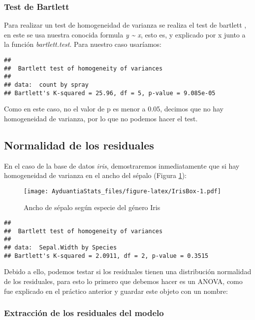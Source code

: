 \documentclass[]{book}
\begin{document}
\subsubsection{Test de Bartlett}\label{test-de-bartlett}

Para realizar un test de homogeneidad de varianza se realiza el test de
bartlett \citep{bartlett1937properties}, en este se usa nuestra conocida
formula \emph{y \textasciitilde{} x}, esto es, y explicado por x junto a
la función \emph{bartlett.test}. Para nuestro caso usaríamos:

\begin{verbatim}
## 
##  Bartlett test of homogeneity of variances
## 
## data:  count by spray
## Bartlett's K-squared = 25.96, df = 5, p-value = 9.085e-05
\end{verbatim}

Como en este caso, no el valor de p es menor a 0.05, decimos que no hay
homogeneidad de varianza, por lo que no podemos hacer el test.

\subsection{Normalidad de los
residuales}\label{normalidad-de-los-residuales}

En el caso de la base de datos \emph{iris}, demostraremos inmediatamente
que si hay homogeneidad de varianza en el ancho del sépalo (Figura
\ref{fig:IrisBox}):

\begin{figure}
\centering
\texttt{[image: AyduantiaStats\_files/figure-latex/IrisBox-1.pdf]}
\caption{\label{fig:IrisBox}Ancho de sépalo según especie del género Iris}
\end{figure}

\begin{verbatim}
## 
##  Bartlett test of homogeneity of variances
## 
## data:  Sepal.Width by Species
## Bartlett's K-squared = 2.0911, df = 2, p-value = 0.3515
\end{verbatim}

Debido a ello, podemos testar si los residuales tienen una distribución
normalidad de los residuales, para esto lo primero que debemos hacer es
un ANOVA, como fue explicado en el práctico anterior y guardar este
objeto con un nombre:

\subsubsection{Extracción de los residuales del
modelo}\label{extraccion-de-los-residuales-del-modelo}
\end{document}
